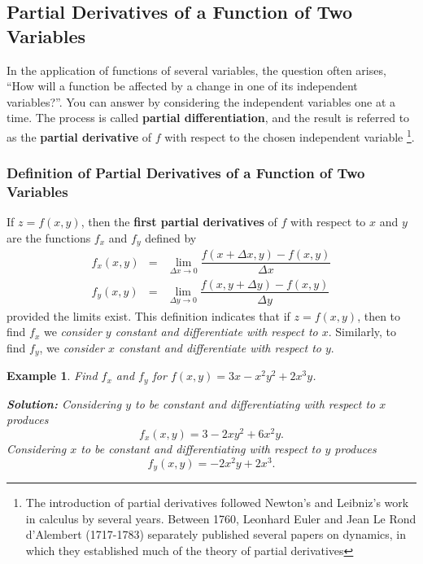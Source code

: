 \documentclass[titlepage,a4paper,12pt]{report}
\newtheorem{example}{Example}[section]
\begin{document}
\subsection{Partial Derivatives of a Function of Two Variables}
In the application of functions of several variables, the question often arises, ``How will a function be affected by a change in one of its independent variables?''. You can answer by considering the independent variables one at a time.  The process is called \textbf{partial differentiation}, and the result is referred to as the \textbf{partial derivative} of $f$ with respect to the chosen independent variable \footnote{The introduction of partial derivatives followed Newton's and Leibniz's work in calculus by several years. Between 1760, Leonhard Euler and Jean Le Rond d'Alembert (1717-1783) separately published several papers on dynamics, in which they established much of the theory of partial derivatives}. 
\subsubsection{Definition of Partial Derivatives of a Function of Two Variables }
If $z=f(x,y)$, then the \textbf{first partial derivatives} of $f$ with respect to $x$ and $y$ are the functions $f_x$ and $f_y$ defined by 
\begin{eqnarray*}
f_x(x,y) &=& \lim _{\Delta x \rightarrow 0} \dfrac{f(x+\Delta x,y)-f(x,y)}{\Delta x}\\
f_y(x,y) &=& \lim _{\Delta y \rightarrow 0} \dfrac{f(x,y+\Delta y)-f(x,y)}{\Delta y}
\end{eqnarray*}
provided the limits exist.
This definition indicates that if $z=f(x,y)$, then to find $f_x$ we \textit{consider $y$ constant and differentiate with respect to $x$}. Similarly, to find $f_y$, we \textit{consider $x$ constant and differentiate with respect to $y$}.
\begin{example}
Find $f_x$ and $f_y$ for $f(x,y)=3x-x^2y^2+2x^3y$.

\noindent \textbf{Solution:} Considering $y$ to be constant and differentiating with respect to $x$ produces 
\[f_x(x,y)=3-2xy^2+6x^2y.\]
Considering $x$ to be constant and differentiating with respect to $y$ produces
\[f_y(x,y)=-2x^2y+2x^3.\]
\end{example}
\end{document}
